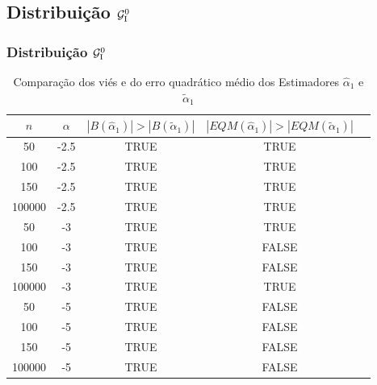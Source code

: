 \subsection{Distribuição $\mathcal{G}_{\rm I}^{0}$}
\begin{frame}
\frametitle{Distribuição $\mathcal{G}_{\rm I}^{0}$}
{\tiny \begin{table}[h]
\caption{\scriptsize Comparação dos viés e do erro quadrático médio dos Estimadores $\widehat{\alpha}_1$ e $\widetilde{\alpha}_1$}
\centering
\begin{tabular}{|c|c|c|c|c|}\hline
$n$ & $\alpha$  & $|B(\widehat{\alpha}_1)|>|B(\widetilde{\alpha}_1)|$ & $|EQM(\widehat{\alpha}_1)|>|EQM(\widetilde{\alpha}_1)|$\\\hline
50     & -2.5  & TRUE & TRUE\\\hline
100    & -2.5  & TRUE & TRUE\\\hline
150    & -2.5  & TRUE & TRUE\\\hline
100000 & -2.5  & TRUE & TRUE\\\hline
50     & -3    & TRUE & TRUE\\\hline
100    & -3    & TRUE & FALSE\\\hline
150    & -3    & TRUE & FALSE\\\hline
100000 & -3    & TRUE & TRUE\\\hline
50     & -5    & TRUE & FALSE\\\hline
100    & -5    & TRUE & FALSE\\\hline
150    & -5    & TRUE & FALSE\\\hline
100000 & -5    & TRUE & FALSE\\\hline
\end{tabular}
\end{table}
}
\end{frame}
